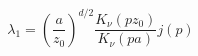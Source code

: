 \begin{equation}
\lambda_1=(\frac a {z_0})^{d/2}\frac {K_\nu(pz_0)} {K_\nu(pa)}
j(p)
\end{equation}

